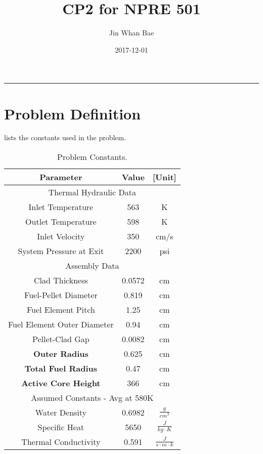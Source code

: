 \documentclass[12pt,letterpaper]{article}
\title{CP2 for NPRE 501}
\author{Jin Whan Bae}
\date{2017-12-01}
\begin{document}
	
	\maketitle
	\hrule
	\onehalfspacing
	\thispagestyle{empty}

\section*{Problem Definition}

 lists the constants used in the problem.


\begin{table}[h]
     \centering
    \begin{tabular}{ccc}
       \hline
       Parameter & Value & [Unit] \\
       \hline
       \multicolumn{3}{c}{Thermal Hydraulic Data}\\
       \hline
       Inlet Temperature & 563 & K \\
       Outlet Temperature & 598 & K \\
       Inlet Velocity & 350 & cm/s \\
       System Pressure at Exit & 2200 & psi \\
       \hline
       \multicolumn{3}{c}{Assembly Data} \\
       \hline
       Clad Thickness & 0.0572 & cm \\
       Fuel-Pellet Diameter & 0.819 & cm \\
       Fuel Element Pitch & 1.25 & cm \\
       Fuel Element Outer Diameter & 0.94& cm \\
       Pellet-Clad Gap & 0.0082 & cm \\
       \textbf{Outer Radius} & 0.625 & cm \\
       \textbf{Total Fuel Radius} & 0.47 & cm \\
       \textbf{Active Core Height} & 366 & cm \\
       \hline
       \multicolumn{3}{c}{Assumed Constants - Avg at 580K} \\
       \hline
       Water Density & 0.6982 & $\frac{g}{cm^3}$ \\
       Specific Heat & 5650 & $\frac{J}{kg\cdot K}$ \\
       Thermal Conductivity & 0.591 & $\frac{J}{s\cdot m\cdot k}$ \\       
       \hline
    \end{tabular}
    \caption {Problem Constants.}
    \label{tab:constants}
\end{table}
\end{document}
